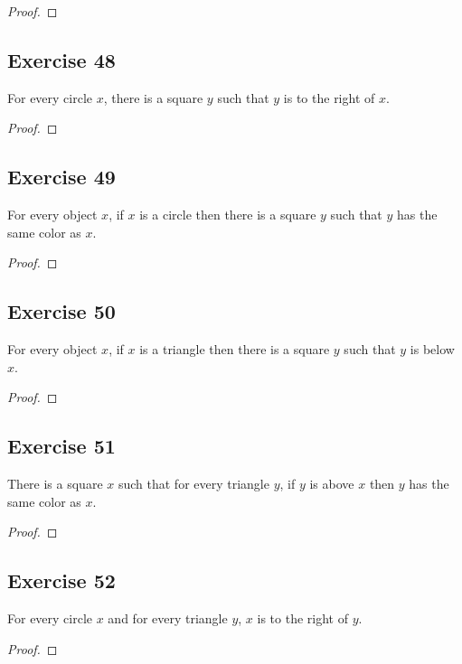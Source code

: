 \documentclass[14pt]{extarticle}
\begin{document}
\begin{proof}

\end{proof}

\subsection{Exercise 48}
For every circle $x$, there is a square $y$ such that $y$ is to the right of $x$.

\begin{proof}

\end{proof}

\subsection{Exercise 49}
For every object $x$, if $x$ is a circle then there is a square $y$ such that $y$ has the same color as $x$.

\begin{proof}

\end{proof}

\subsection{Exercise 50}
For every object $x$, if $x$ is a triangle then there is a square $y$ such that $y$ is below $x$.

\begin{proof}

\end{proof}

\subsection{Exercise 51}
There is a square $x$ such that for every triangle $y$, if $y$ is above $x$ then $y$ has the same color as $x$.

\begin{proof}

\end{proof}

\subsection{Exercise 52}
For every circle $x$ and for every triangle $y$, $x$ is to the right of $y$.

\begin{proof}

\end{proof}
\end{document}
